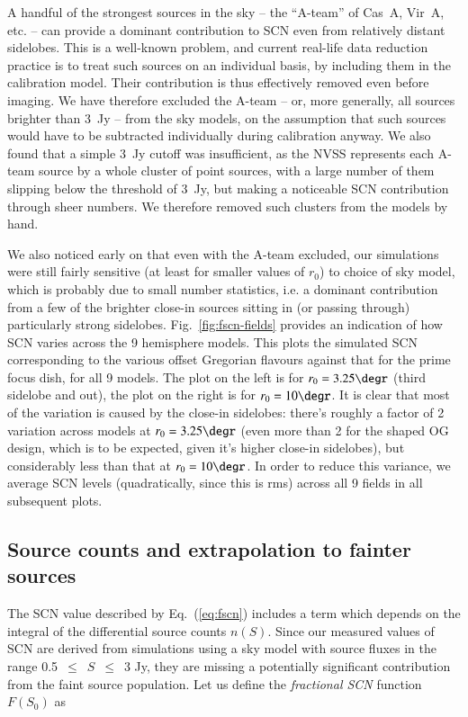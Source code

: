 \documentclass{aa}
\begin{document}
A handful of the strongest sources in the sky -- the ``A-team'' of  Cas~A, Vir~A, etc. -- can provide a dominant contribution to SCN even from relatively distant sidelobes. This is a well-known problem, and current real-life data reduction practice is to treat such sources on an individual basis, by including them in the calibration model. Their contribution is thus effectively removed even before imaging. We have therefore excluded the A-team -- or, more generally, all sources brighter than 3~Jy -- from the sky models, on the assumption that such sources would have to be subtracted individually during calibration anyway. We also found that a simple 3~Jy cutoff was insufficient, as the NVSS represents each A-team source by a whole cluster of point sources, with a large number of them slipping below the threshold of 3~Jy, but making a noticeable SCN contribution through sheer numbers. We therefore removed such clusters from the models by hand.

We also noticed early on that even with the A-team excluded, our simulations were still fairly sensitive (at least for smaller values of $r_0$) to choice of sky model, which is probably due to small number statistics, i.e. a dominant contribution from a few of the brighter close-in sources sitting in (or passing through) particularly strong sidelobes. Fig.~\ref{fig:fscn-fields} provides an indication of how SCN varies across the 9 hemisphere models. This plots the simulated SCN corresponding to the various offset Gregorian flavours against that for the prime focus dish, for all 9 models. The plot on the left is for $r_0=3.25\degr$ (third sidelobe and out), the plot on the right is for $r_0=10\degr$. It is clear that most of the variation is caused by the close-in sidelobes: there's roughly a factor of 2 variation across models at $r_0=3.25\degr$ (even more than 2 for the shaped OG design, which is to be expected, given it's higher close-in sidelobes), but considerably less than that at $r_0=10\degr$. In 
order to reduce this variance, we average SCN levels (quadratically, since this is rms) across all 9 fields in all subsequent plots.

\subsection{Source counts and extrapolation to fainter sources}
\label{sec:source-counts}

The SCN value described by Eq.~(\ref{eq:fscn}) includes a term which depends on the integral of the differential source counts $n(S)$. Since our measured values of SCN are derived from simulations using a sky model with source fluxes in the range 0.5~$\leq$~$S$~$\leq$~3 Jy, they are missing a potentially significant contribution from the faint source population. Let us define the {\em fractional SCN} function $F(S_0)$ as
\end{document}
